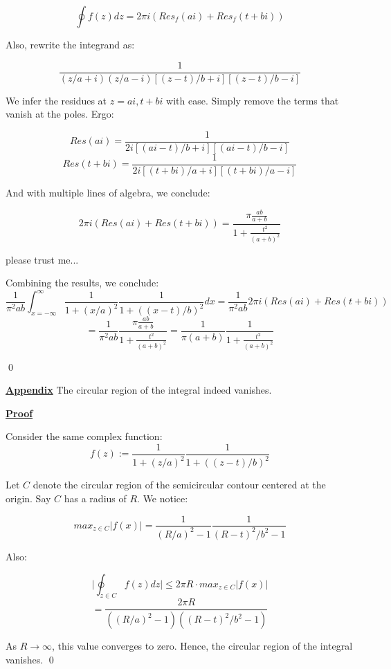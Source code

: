 \documentclass{article}
\newcommand{\new}[1]{
    \vspace{2mm}
    \noindent
    \textbf{
    \underline{#1}}
}
\newcommand{\Proof}{{
    \vspace{2mm}
    \noindent
    \textbf{
    \underline{Proof}}
}
}
\begin{document}
\[
    \oint f(z)dz = 2\pi i(Res_f(ai) + Res_f(t + bi))
\]

Also, rewrite the integrand as:

\[
    \frac{1}
    {
        (z/a + i)(z/a - i)
        [(z-t)/b + i][(z-t)/b - i]
    }
\]

We infer the residues at $z = ai, t + bi$ with ease. 
Simply remove the terms that vanish at the poles. Ergo:

\[
    Res(ai) = 
    \frac{1}
    {2i[(ai - t)/b + i][(ai - t)/b - i]}
\]
\[
    Res(t + bi)= 
    \frac{1}
    {2i [(t + bi)/a + i][(t + bi)/a - i]}
\]

And with multiple lines of algebra, we conclude:

\[
    2\pi i (Res(ai)+Res(t + bi))
    = \frac{\pi
    \frac{ab}{a+b}
    }
    {1+\frac{t^2}{(a+b)^2}}
\]
\color{blue}

please trust me...
\color{black}
\newpage

Combining the results, we conclude:
\[
    \frac{1}{\pi^2 a b}
    \int_{x = -\infty}^{\infty}
        \frac{1}{1+(x/a)^2}
        \frac{1}{1+((x-t)/b)^2}dx
    =  
    \frac{1}{\pi^2 ab}
    2\pi i (Res(ai)+Res(t + bi))\]\[
    = \frac{1}{\pi^2 ab}\frac{\pi
    \frac{ab}{a+b}
    }
    {1+\frac{t^2}{(a+b)^2}}
    =\frac{1}{\pi (a+b)}
    \frac{1}{1+ \frac{t^2}{(a+b)^2}}
\]

\qed 

\new{Appendix} The circular region of the integral indeed vanishes. 

\Proof
Consider the same complex function:
\[
    f(z):=
        \frac{1}{1+(z/a)^2}
        \frac{1}{1+((z-t)/b)^2}
    \] 

    Let $C$ denote the circular region of the 
    semicircular contour centered at the origin. 
    Say $C$ has a radius of $R$. We notice:

\[
    max_{z \in C}|f(x)| = 
    \frac{1}{(R/a)^2 - 1}\frac{1}{(R-t)^2/b^2-1}
\]


Also:

\[
    \bigg|\oint_{z\in C} f(z)dz \bigg|
    \leq 2\pi R \cdot max_{z \in C}|f(x)| \]\[
    = \frac{2\pi R}{((R/a)^2 - 1)((R-t)^2/b^2-1)}
\]

As $R \rightarrow \infty$, this value converges to zero. 
Hence, the circular region of the integral vanishes. 
\qed
\end{document}
